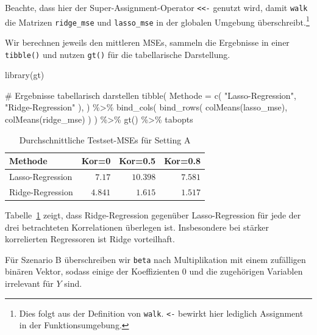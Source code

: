 \documentclass[
  a4paper,
  DIV=11,
  oneside]{scrreprt}
\newenvironment{Shaded}{\begin{snugshade}}{\end{snugshade}}
\newcommand{\AttributeTok}[1]{\textcolor[rgb]{0.40,0.45,0.13}{#1}}
\newcommand{\CommentTok}[1]{\textcolor[rgb]{0.37,0.37,0.37}{#1}}
\newcommand{\FunctionTok}[1]{\textcolor[rgb]{0.28,0.35,0.67}{#1}}
\newcommand{\NormalTok}[1]{\textcolor[rgb]{0.00,0.23,0.31}{#1}}
\newcommand{\SpecialCharTok}[1]{\textcolor[rgb]{0.37,0.37,0.37}{#1}}
\newcommand{\StringTok}[1]{\textcolor[rgb]{0.13,0.47,0.30}{#1}}
\begin{document}
Beachte, dass hier der Super-Assignment-Operator
\texttt{\textless{}\textless{}-} genutzt wird, damit \texttt{walk} die
Matrizen \texttt{ridge\_mse} und \texttt{lasso\_mse} in der globalen
Umgebung überschreibt.\footnote{Dies folgt aus der Definition von
  \texttt{walk}. \texttt{\textless{}-} bewirkt hier lediglich Assignment
  in der Funktionsumgebung.}

Wir berechnen jeweils den mittleren MSEs, sammeln die Ergebnisse in
einer \texttt{tibble()} und nutzen \texttt{gt()} für die tabellarische
Darstellung.

\begin{Shaded}
\begin{Highlighting}[]
\FunctionTok{library}\NormalTok{(gt)}

\CommentTok{\# Ergebnisse tabellarisch darstellen}
\FunctionTok{tibble}\NormalTok{(}
  \AttributeTok{Methode =} \FunctionTok{c}\NormalTok{(}
    \StringTok{"Lasso{-}Regression"}\NormalTok{, }
    \StringTok{"Ridge{-}Regression"}
\NormalTok{  ),}
\NormalTok{) }\SpecialCharTok{\%\textgreater{}\%}
  \FunctionTok{bind\_cols}\NormalTok{(}
    \FunctionTok{bind\_rows}\NormalTok{(}
      \FunctionTok{colMeans}\NormalTok{(lasso\_mse),}
      \FunctionTok{colMeans}\NormalTok{(ridge\_mse)  }
\NormalTok{    )    }
\NormalTok{  ) }\SpecialCharTok{\%\textgreater{}\%}
  \FunctionTok{gt}\NormalTok{() }\SpecialCharTok{\%\textgreater{}\%}
\NormalTok{  tabopts}
\end{Highlighting}
\end{Shaded}

\hypertarget{tbl-lrsimA}{}
\begin{longtable}{lrrr}
\caption{\label{tbl-lrsimA}Durchschnittliche Testset-MSEs für Setting A }\tabularnewline

\toprule
Methode & Kor=0 & Kor=0.5 & Kor=0.8 \\ 
\midrule\addlinespace[2.5pt]
Lasso-Regression & $7.17$ & $10.398$ & $7.581$ \\ 
Ridge-Regression & $4.841$ & $1.615$ & $1.517$ \\ 
\bottomrule
\end{longtable}

Tabelle~\ref{tbl-lrsimA} zeigt, dass Ridge-Regression gegenüber
Lasso-Regression für jede der drei betrachteten Korrelationen überlegen
ist. Insbesondere bei stärker korrelierten Regressoren ist Ridge
vorteilhaft.

Für Szenario B überschreiben wir \texttt{beta} nach Multiplikation mit
einem zufälligen binären Vektor, sodass einige der Koeffizienten \(0\)
und die zugehörigen Variablen irrelevant für \(Y\) sind.
\end{document}
